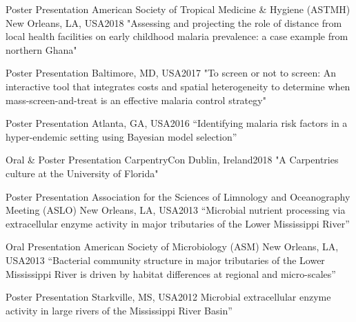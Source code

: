 


\begin{cventries}

  \cventry
    {Poster Presentation} %
    {American Society of Tropical Medicine \& Hygiene (ASTMH)} %
    {} %
    {New Orleans, LA, USA{\enskip\cdotp\enskip}2018} %
    {
     {"Assessing and projecting the role of distance from local health facilities on early childhood malaria prevalence: a case example from northern Ghana"}
    }

  \cventry
    {Poster Presentation} %
    {} %
    {} %
    {Baltimore, MD, USA{\enskip\cdotp\enskip}2017} %
    {
     {"To screen or not to screen: An interactive tool that integrates costs and spatial heterogeneity to determine when mass-screen-and-treat is an effective malaria control strategy"}
    }

\cventry
    {Poster Presentation} %
    {} %
    {} %
    {Atlanta, GA, USA{\enskip\cdotp\enskip}2016} %
    {
     {“Identifying malaria risk factors in a hyper-endemic setting using Bayesian model selection”}
    }

 \cventry
    {Oral \& Poster Presentation} %
    {CarpentryCon} %
    {} %
    {Dublin, Ireland{\enskip\cdotp\enskip}2018} %
    {
     {"A Carpentries culture at the University of Florida"}
    }

\cventry
    {Poster Presentation} %
    {Association for the Sciences of Limnology and Oceanography Meeting (ASLO)} %
    {} %
    {New Orleans, LA, USA{\enskip\cdotp\enskip}2013} %
    {
     {“Microbial nutrient processing via extracellular enzyme activity in major tributaries of the Lower Mississippi River”}
    }

\cventry
    {Oral Presentation} %
    {American Society of Microbiology (ASM)} %
    {} %
    {New Orleans, LA, USA{\enskip\cdotp\enskip}2013} %
    {
     {“Bacterial community structure in major tributaries of the Lower Mississippi River is driven by habitat differences at regional and micro-scales”}
    }

\cventry
    {Poster Presentation} %
    {} %
    {} %
    {Starkville, MS, USA{\enskip\cdotp\enskip}2012} %
    {
     {Microbial extracellular enzyme activity in large rivers of the Mississippi River Basin”}
    }
    
\end{cventries}



